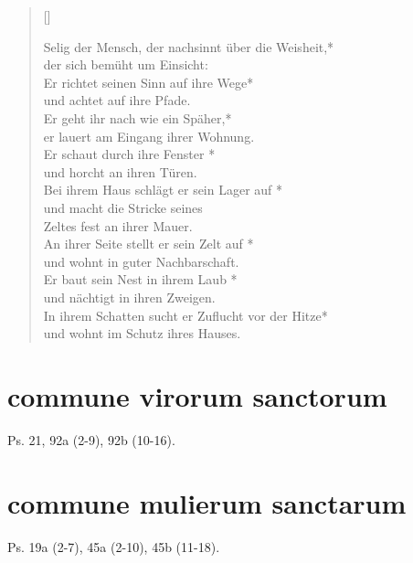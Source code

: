\begin{verse}[\versewidth]

Selig der Mensch, der nachsinnt über die Weisheit,*\\
der sich bemüht um Einsicht:\\
\vin Er richtet seinen Sinn auf ihre Wege*\\
\vin und achtet auf ihre Pfade.\\
Er geht ihr nach wie ein Späher,*\\
er lauert am Eingang ihrer Wohnung.\\
\vin Er schaut durch ihre Fenster *\\
\vin und horcht an ihren Türen.\\
Bei ihrem Haus schlägt er sein Lager auf *\\
und macht die Stricke seines \\ Zeltes fest an ihrer Mauer.\\
\vin An ihrer Seite stellt er sein Zelt auf *\\
\vin und wohnt in guter Nachbarschaft.\\
Er baut sein Nest in ihrem Laub *\\
und nächtigt in ihren Zweigen.\\
\vin In ihrem Schatten sucht er Zuflucht vor der Hitze*\\
\vin und wohnt im Schutz ihres Hauses.\\
\end{verse}

\section{commune virorum sanctorum}

Ps. 21, 92a (2-9), 92b (10-16).\\


\section{commune mulierum sanctarum}

Ps. 19a (2-7), 45a (2-10), 45b (11-18).\\


